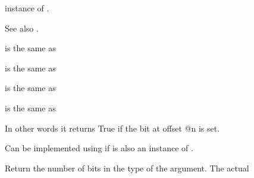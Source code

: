 \begin{haddockdesc}
{\begin{haddockdesc}
{ instance of .\par
See also .\par}
\end{haddockdesc}
\begin{haddockdesc}
\item[\begin{tabular}{@{}l}
setBit :: a -> Int -> a
\end{tabular}]
{\haddockbegindoc
{} is the same as \par}
\end{haddockdesc}
\begin{haddockdesc}
\item[\begin{tabular}{@{}l}
clearBit :: a -> Int -> a
\end{tabular}]
{\haddockbegindoc
{} is the same as \par}
\end{haddockdesc}
\begin{haddockdesc}
\item[\begin{tabular}{@{}l}
complementBit :: a -> Int -> a
\end{tabular}]
{\haddockbegindoc
{} is the same as \par}
\end{haddockdesc}
\begin{haddockdesc}
\item[\begin{tabular}{@{}l}
testBit :: a -> Int -> Bool
\end{tabular}]
{\haddockbegindoc
{} is the same as \par
In other words it returns True if the bit at offset @n
        is set.\par
Can be implemented using  if  is also an
        instance of .\par}
\end{haddockdesc}
\begin{haddockdesc}
\item[\begin{tabular}{@{}l}
bitSize :: a -> Int
\end{tabular}]
{\haddockbegindoc
Return the number of bits in the type of the argument.  The actual
}
\end{haddockdesc}}
\end{haddockdesc}
